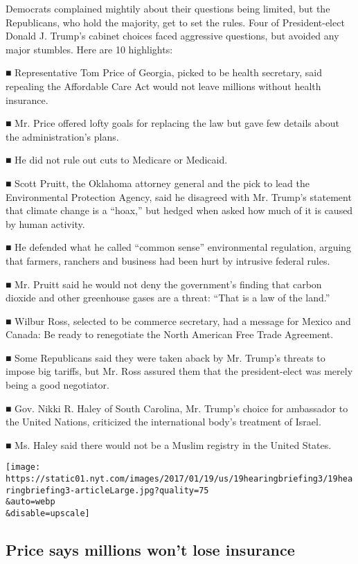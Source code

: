 Democrats complained mightily about their questions being limited, but
the Republicans, who hold the majority, get to set the rules. Four of
President-elect Donald J. Trump's cabinet choices faced aggressive
questions, but avoided any major stumbles. Here are 10 highlights:

■ Representative Tom Price of Georgia, picked to be health secretary,
said repealing the Affordable Care Act would not leave millions without
health insurance.

■ Mr. Price offered lofty goals for replacing the law but gave few
details about the administration's plans.

■ He did not rule out cuts to Medicare or Medicaid.

■ Scott Pruitt, the Oklahoma attorney general and the pick to lead the
Environmental Protection Agency, said he disagreed with Mr. Trump's
statement that climate change is a ``hoax,'' but hedged when asked how
much of it is caused by human activity.

■ He defended what he called ``common sense'' environmental regulation,
arguing that farmers, ranchers and business had been hurt by intrusive
federal rules.

■ Mr. Pruitt said he would not deny the government's finding that carbon
dioxide and other greenhouse gases are a threat: ``That is a law of the
land.''

■ Wilbur Ross, selected to be commerce secretary, had a message for
Mexico and Canada: Be ready to renegotiate the North American Free Trade
Agreement.

■ Some Republicans said they were taken aback by Mr. Trump's threats to
impose big tariffs, but Mr. Ross assured them that the president-elect
was merely being a good negotiator.

■ Gov. Nikki R. Haley of South Carolina, Mr. Trump's choice for
ambassador to the United Nations, criticized the international body's
treatment of Israel.

■ Ms. Haley said there would not be a Muslim registry in the United
States.

\texttt{[image: https://static01.nyt.com/images/2017/01/19/us/19hearingbriefing3/19hearingbriefing3-articleLarge.jpg?quality=75\\\&auto=webp\\\&disable=upscale]}

\hypertarget{price-says-millions-wont-lose-insurance}{%
\subsection{Price says millions won't lose
insurance}\label{price-says-millions-wont-lose-insurance}}

